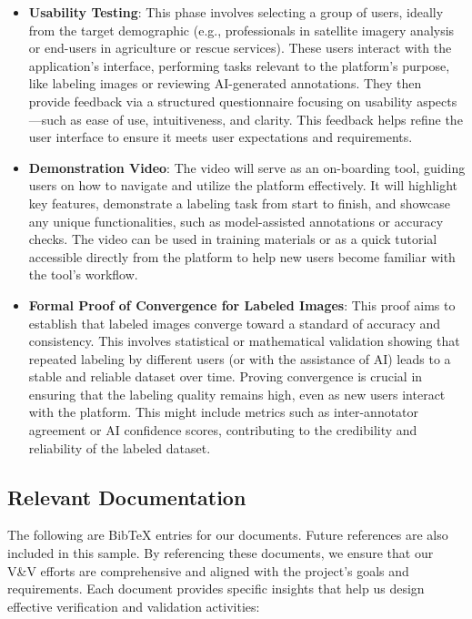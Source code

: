 \documentclass[12pt, titlepage]{article}
\begin{document}
\begin{itemize}
    \item \textbf{Usability Testing}: This phase involves selecting a group of users, ideally from the target demographic (e.g., professionals in satellite imagery analysis or end-users in agriculture or rescue services). These users interact with the application's interface, performing tasks relevant to the platform's purpose, like labeling images or reviewing AI-generated annotations. They then provide feedback via a structured questionnaire focusing on usability aspects—such as ease of use, intuitiveness, and clarity. This feedback helps refine the user interface to ensure it meets user expectations and requirements.

    \item \textbf{Demonstration Video}: The video will serve as an on-boarding tool, guiding users on how to navigate and utilize the platform effectively. It will highlight key features, demonstrate a labeling task from start to finish, and showcase any unique functionalities, such as model-assisted annotations or accuracy checks. The video can be used in training materials or as a quick tutorial accessible directly from the platform to help new users become familiar with the tool's workflow.

    \item \textbf{Formal Proof of Convergence for Labeled Images}: This proof aims to establish that labeled images converge toward a standard of accuracy and consistency. This involves statistical or mathematical validation showing that repeated labeling by different users (or with the assistance of AI) leads to a stable and reliable dataset over time. Proving convergence is crucial in ensuring that the labeling quality remains high, even as new users interact with the platform. This might include metrics such as inter-annotator agreement or AI confidence scores, contributing to the credibility and reliability of the labeled dataset.
\end{itemize}
  
\subsection{Relevant Documentation}

\bigskip

The following are BibTeX entries for our documents. Future references are also included in this sample. By referencing these documents, we ensure that our V\&V efforts are comprehensive and aligned with the project's goals and requirements. Each document provides specific insights that help us design effective verification and validation activities:
\end{document}
